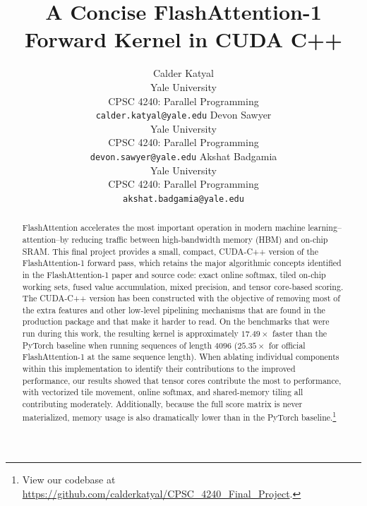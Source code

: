 \documentclass{article}
\title{A Concise FlashAttention-1 Forward Kernel in CUDA C++}
\author{
Calder Katyal \\
Yale University \\
CPSC 4240: Parallel Programming \\
\texttt{calder.katyal@yale.edu}
\And
Devon Sawyer \\
Yale University \\
CPSC 4240: Parallel Programming \\
\texttt{devon.sawyer@yale.edu}
\And
Akshat Badgamia \\
Yale University \\
CPSC 4240: Parallel Programming \\
\texttt{akshat.badgamia@yale.edu}
}
\begin{document}
\maketitle

\begin{abstract}
FlashAttention accelerates the most important operation in modern machine learning--attention--by reducing traffic between high-bandwidth memory (HBM) and on-chip SRAM. This final project provides a small, compact, CUDA-C++ version of the FlashAttention-1 forward pass, which retains the major algorithmic concepts identified in the FlashAttention-1 paper and source code: exact online softmax, tiled on-chip working sets, fused value accumulation, mixed precision, and tensor core-based scoring. The CUDA-C++ version has been constructed with the objective of removing most of the extra features and other low-level pipelining mechanisms that are found in the production package and that make it harder to read. On the benchmarks that were run during this work, the resulting kernel is approximately $17.49\times$ faster than the PyTorch baseline when running sequences of length $4096$ ($25.35\times$ for official FlashAttention-1 at the same sequence length). When ablating individual components within this implementation to identify their contributions to the improved performance, our results showed that tensor cores contribute the most to performance, with vectorized tile movement, online softmax, and shared-memory tiling all contributing moderately. Additionally, because the full score matrix is never materialized, memory usage is also dramatically lower than in the PyTorch baseline.\footnote{View our codebase at \url{https://github.com/calderkatyal/CPSC_4240_Final_Project}.}
\end{abstract}
\end{document}
